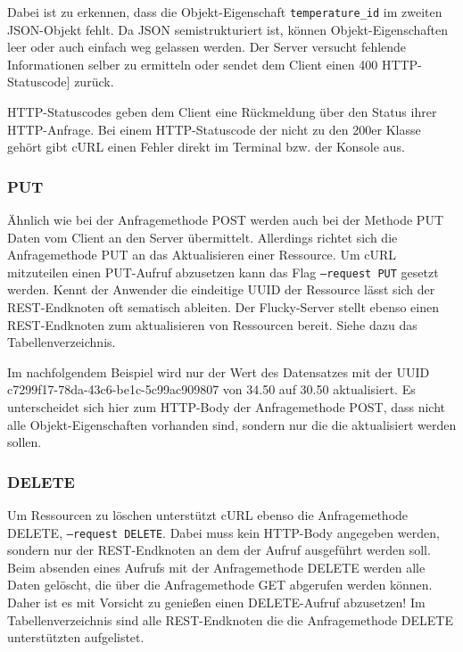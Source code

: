 Dabei ist zu erkennen, dass die Objekt-Eigenschaft \texttt{temperature\_id} im
zweiten JSON-Objekt fehlt. Da JSON semistrukturiert ist, können
Objekt-Eigenschaften leer oder auch einfach weg gelassen werden. Der Server
versucht fehlende Informationen selber zu ermitteln oder sendet dem Client einen
400 HTTP-Statuscode] zurück.

HTTP-Statuscodes geben dem Client eine Rückmeldung über den Status ihrer
HTTP-Anfrage. Bei einem HTTP-Statuscode der nicht zu den 200er Klasse gehört
gibt cURL einen Fehler direkt im Terminal bzw. der Konsole aus.

\subsubsection{PUT}%
\label{sec:rest.ansteuern.put}

Ähnlich wie bei der Anfragemethode POST werden auch bei der Methode PUT Daten
vom Client an den Server übermittelt. Allerdings richtet sich die Anfragemethode
PUT an das Aktualisieren einer Ressource. Um cURL mitzuteilen einen PUT-Aufruf
abzusetzen kann das Flag \texttt{--request PUT} gesetzt werden. Kennt der
Anwender die eindeitige UUID der Ressource lässt sich der REST-Endknoten oft
sematisch ableiten. Der Flucky-Server stellt ebenso einen REST-Endknoten zum
aktualisieren von Ressourcen bereit. Siehe dazu das Tabellenverzeichnis.

Im nachfolgendem Beispiel wird nur der Wert des Datensatzes mit der UUID
c7299f17-78da-43c6-be1c-5c99ac909807 von 34.50 auf 30.50 aktualisiert. Es
unterscheidet sich hier zum HTTP-Body der Anfragemethode POST, dass nicht alle
Objekt-Eigenschaften vorhanden sind, sondern nur die die aktualisiert werden
sollen.


\subsubsection{DELETE}%
\label{sec:rest.ansteuern.delete}

Um Ressourcen zu löschen unterstützt cURL ebenso die Anfragemethode DELETE,
\texttt{--request DELETE}. Dabei muss kein HTTP-Body angegeben werden, sondern
nur der REST-Endknoten an dem der Aufruf ausgeführt werden soll. Beim absenden
eines Aufrufs mit der Anfragemethode DELETE werden alle Daten gelöscht, die über
die Anfragemethode GET abgerufen werden können. Daher ist es mit Vorsicht zu
genießen einen DELETE-Aufruf abzusetzen! Im Tabellenverzeichnis sind alle
REST-Endknoten die die Anfragemethode DELETE unterstützten aufgelistet.

